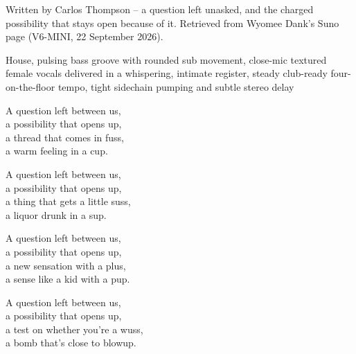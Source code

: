 
\begin{notes}
Written by Carlos Thompson -- a question left unasked, and the charged possibility that stays open because of it. Retrieved from Wyomee Dank's Suno page (V6-MINI, 22 September 2026).
\end{notes}
\begin{style}
House, pulsing bass groove with rounded sub movement, close-mic textured female vocals delivered in a whispering, intimate register, steady club-ready four-on-the-floor tempo, tight sidechain pumping and subtle stereo delay
\end{style}
\begin{lyrics}
A question left between us,\\
a possibility that opens up,\\
a thread that comes in fuss,\\
a warm feeling in a cup.

A question left between us,\\
a possibility that opens up,\\
a thing that gets a little suss,\\
a liquor drunk in a sup.

A question left between us,\\
a possibility that opens up,\\
a new sensation with a plus,\\
a sense like a kid with a pup.

A question left between us,\\
a possibility that opens up,\\
a test on whether you're a wuss,\\
a bomb that's close to blowup.
\end{lyrics}


